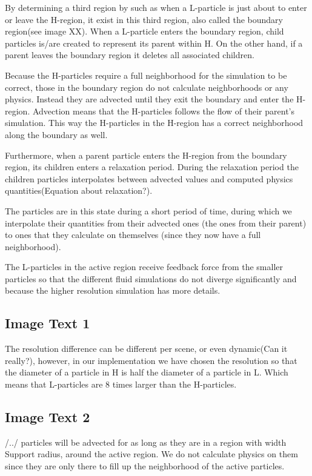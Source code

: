 \documentclass[../../main.tex]{subfiles}
\begin{document}
By determining a third region by such as when a L-particle is just about to enter or leave the H-region, it exist in this third region, also called the boundary region(see image XX). When a L-particle enters the boundary region, child particles is/are created to represent its parent within H. On the other hand, if a parent leaves the boundary region it deletes all associated children. 

Because the H-particles require a full neighborhood for the simulation to be correct, those in the boundary region do not calculate neighborhoods or any physics. Instead they are advected until they exit the boundary and enter the H-region. Advection means that the H-particles follows the flow of their parent's simulation. This way the H-particles in the H-region has a correct neighborhood along the boundary as well. 

Furthermore, when a parent particle enters the H-region from the boundary region, its children enters a relaxation period. During the relaxation period the children particles interpolates between advected values and computed physics quantities(Equation about relaxation?). 

The particles are in this state during a short period of time, during which we interpolate their quantities from their advected ones (the ones from their parent) to ones that they calculate on themselves (since they now have a full neighborhood). 

The L-particles in the active region receive feedback force from the smaller particles so that the different fluid simulations do not diverge significantly and because the higher resolution simulation has more details. 

\subsection{Image Text 1}
The resolution difference can be different per scene, or even dynamic(Can it really?), however, in our implementation we have chosen the resolution so that the diameter of a particle in H is half the diameter of a particle in L. Which means that L-particles are 8 times larger than the H-particles.

\subsection{Image Text 2}
/../ particles will be advected for as long as they are in a region with width Support radius, around the active region. We do not calculate physics on them since they are only there to fill up the neighborhood of the active particles.
\end{document}
